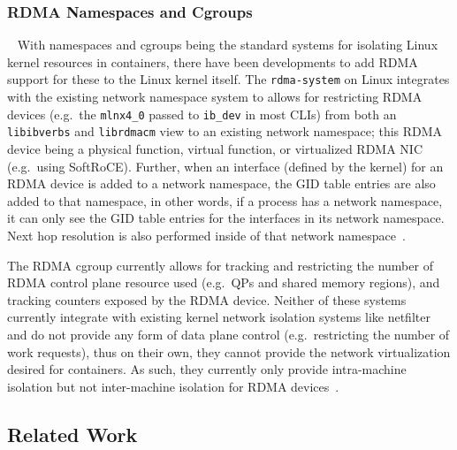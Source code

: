 \documentclass[12pt,titlepage]{article}
\begin{document}
\subsubsection{RDMA Namespaces and Cgroups}~\label{subsubsec:RDMA Namespaces and Cgroups}
With namespaces and cgroups being the standard systems for isolating Linux kernel resources in containers, there have been developments to add RDMA support for these to the Linux kernel itself.
The \texttt{rdma-system} on Linux integrates with the existing network namespace system to allows for restricting RDMA devices (e.g.\ the \texttt{mlnx4\_0} passed to \texttt{ib\_dev} in most CLIs) from both an \texttt{libibverbs} and \texttt{librdmacm} view to an existing network namespace;
this RDMA device being a physical function, virtual function, or virtualized RDMA NIC (e.g.\ using SoftRoCE).
Further, when an interface (defined by the kernel) for an RDMA device is added to a network namespace, the GID table entries are also added to that namespace, in other words, if a process has a network namespace, it can only see the GID table entries for the interfaces in its network namespace.
Next hop resolution is also performed inside of that network namespace~\cite{rdmacmnspatch}.

The RDMA cgroup currently allows for tracking and restricting the number of RDMA control plane resource used (e.g.\ QPs and shared memory regions), and tracking counters exposed by the RDMA device.
Neither of these systems currently integrate with existing kernel network isolation systems like netfilter and do not provide any form of data plane control (e.g.\ restricting the number of work requests), thus on their own, they cannot provide the network virtualization desired for containers.
As such, they currently only provide intra-machine isolation but not inter-machine isolation for RDMA devices~\cite{rdmanamespaceman,rdmacgroups,mellanoxcontainersupdate2018,mlnxcontainerjourney,mlnxrdmadeviceisolation}.


\subsection{Related Work}
\end{document}
